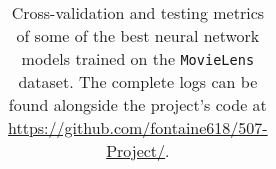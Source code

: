 \begin{table}
\begin{tabular}{lcclccccc}
           

\bottomrule
\end{tabular}
\caption{Cross-validation and testing metrics of some of the best neural network models trained on the \texttt{MovieLens} dataset. The complete logs can be found alongside the project's code at \url{https://github.com/fontaine618/507-Project/}.}
\label{tab:results.nn}
\end{table}
